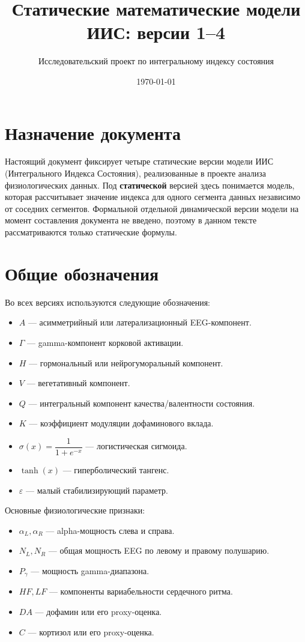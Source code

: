 \documentclass[12pt,a4paper]{article}
\title{Статические математические модели ИИС: версии 1--4}
\author{Исследовательский проект по интегральному индексу состояния}
\date{\today}
\begin{document}
\maketitle

\section{Назначение документа}
Настоящий документ фиксирует четыре статические версии модели ИИС (Интегрального Индекса Состояния), реализованные в проекте анализа физиологических данных. Под \textbf{статической} версией здесь понимается модель, которая рассчитывает значение индекса для одного сегмента данных независимо от соседних сегментов. Формальной отдельной динамической версии модели на момент составления документа не введено, поэтому в данном тексте рассматриваются только статические формулы.

\section{Общие обозначения}
Во всех версиях используются следующие обозначения:
\begin{itemize}[leftmargin=1.25cm]
    \item $A$ --- асимметрийный или латерализационный EEG-компонент.
    \item $\Gamma$ --- gamma-компонент корковой активации.
    \item $H$ --- гормональный или нейрогуморальный компонент.
    \item $V$ --- вегетативный компонент.
    \item $Q$ --- интегральный компонент качества/валентности состояния.
    \item $K$ --- коэффициент модуляции дофаминового вклада.
    \item $\sigma(x)=\dfrac{1}{1+e^{-x}}$ --- логистическая сигмоида.
    \item $\tanh(x)$ --- гиперболический тангенс.
    \item $\varepsilon$ --- малый стабилизирующий параметр.
\end{itemize}

Основные физиологические признаки:
\begin{itemize}[leftmargin=1.25cm]
    \item $\alpha_L,\alpha_R$ --- alpha-мощность слева и справа.
    \item $N_L,N_R$ --- общая мощность EEG по левому и правому полушарию.
    \item $P_\gamma$ --- мощность gamma-диапазона.
    \item $HF, LF$ --- компоненты вариабельности сердечного ритма.
    \item $DA$ --- дофамин или его proxy-оценка.
    \item $C$ --- кортизол или его proxy-оценка.
\end{itemize}
\end{document}

